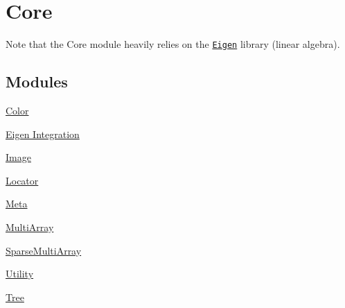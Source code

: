 \hypertarget{group___core}{\section{Core}
\label{group___core}
}


Note that the Core module heavily relies on the \href{http://eigen.tuxfamily.org/}{\tt Eigen} library (linear algebra).  


\subsection*{Modules}
\begin{DoxyCompactItemize}
\item 
\hyperlink{group___color}{Color}
\item 
\hyperlink{group___eigen_typedefs}{Eigen Integration}
\item 
\hyperlink{group___image}{Image}
\item 
\hyperlink{group___locator}{Locator}
\item 
\hyperlink{group___meta}{Meta}
\item 
\hyperlink{group___multi_array}{Multi\-Array}
\item 
\hyperlink{group___sparse_multi_array}{Sparse\-Multi\-Array}
\item 
\hyperlink{group___utility}{Utility}
\item 
\hyperlink{group___tree}{Tree}
\end{DoxyCompactItemize}
